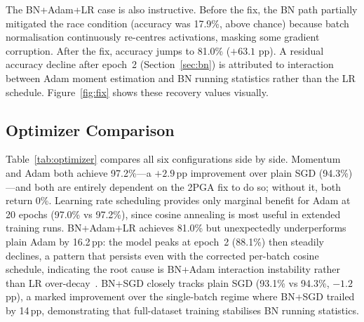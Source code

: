 \documentclass[conference]{IEEEtran}
\begin{document}
The BN+Adam+LR case is also instructive. Before the fix, the BN path partially mitigated the race condition (accuracy was 17.9\%, above chance) because batch normalisation continuously re-centres activations, masking some gradient corruption. After the fix, accuracy jumps to 81.0\% ($+63.1$ pp). A residual accuracy decline after epoch~2 (Section~\ref{sec:bn}) is attributed to interaction between Adam moment estimation and BN running statistics rather than the LR schedule. Figure~\ref{fig:fix} shows these recovery values visually.

\begin{table}[htbp]
\caption{Accuracy Before and After Two-Phase Gradient Fix}
\begin{center}
\label{tab:bugfix}
\end{center}
\end{table}

\subsection{Optimizer Comparison}

Table~\ref{tab:optimizer} compares all six configurations side by side. Momentum and Adam both achieve 97.2\%—a $+2.9$\,pp improvement over plain SGD (94.3\%)—and both are entirely dependent on the 2PGA fix to do so; without it, both return 0\%. Learning rate scheduling provides only marginal benefit for Adam at 20 epochs (97.0\% vs 97.2\%), since cosine annealing is most useful in extended training runs. BN+Adam+LR achieves 81.0\% but unexpectedly underperforms plain Adam by 16.2\,pp: the model peaks at epoch~2 (88.1\%) then steadily declines, a pattern that persists even with the corrected per-batch cosine schedule, indicating the root cause is BN+Adam interaction instability rather than LR over-decay~\cite{b8}. BN+SGD closely tracks plain SGD (93.1\% vs 94.3\%, $-1.2$\,pp), a marked improvement over the single-batch regime where BN+SGD trailed by 14\,pp, demonstrating that full-dataset training stabilises BN running statistics.
\end{document}
